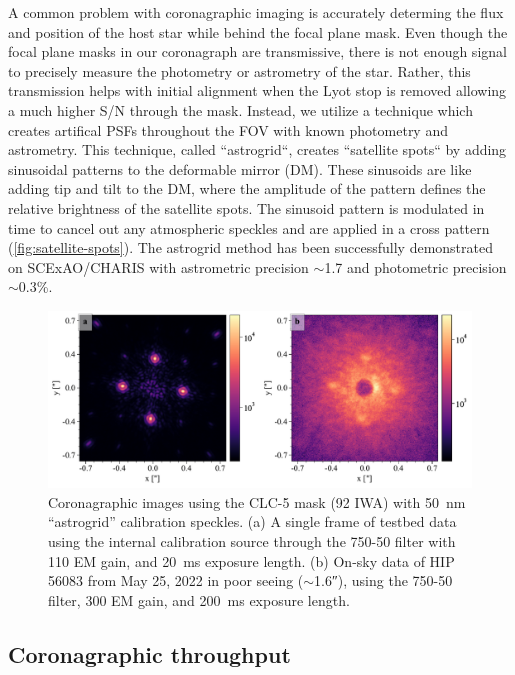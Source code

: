 \documentclass[]{spie}  %
\begin{document}
A common problem with coronagraphic imaging is accurately determing the flux and position of the host star while behind the focal plane mask. Even though the focal plane masks in our coronagraph are transmissive, there is not enough signal to precisely measure the photometry or astrometry of the star. Rather, this transmission helps with initial alignment when the Lyot stop is removed allowing a much higher S/N through the mask. Instead, we utilize a technique which creates artifical PSFs throughout the FOV with known photometry and astrometry. This technique, called ``astrogrid``\cite{sahoo2020}, creates ``satellite spots`` by adding sinusoidal patterns to the deformable mirror (DM). These sinusoids are like adding tip and tilt to the DM, where the amplitude of the pattern defines the relative brightness of the satellite spots. The sinusoid pattern is modulated in time to cancel out any atmospheric speckles and are applied in a cross pattern (\autoref{fig:satellite-spots}). The astrogrid method has been successfully demonstrated on SCExAO/CHARIS with astrometric precision $\sim$\qty{1.7}{\milliarcsecond} and photometric precision $\sim$0.3\%\cite{currie2020}.

\begin{figure}
   \centering
   \includegraphics[width=\textwidth]{figures/astrogrid_psf}
   \caption{Coronagraphic images using the CLC-5 mask (\qty{92}{\milliarcsecond} IWA) with \qty{50}{\nano\meter} ``astrogrid'' calibration speckles. (a) A single frame of testbed data using the internal calibration source through the 750-50 filter with 110 EM gain, and \qty{20}{\milli\second} exposure length. (b) On-sky data of HIP 56083 from May 25, 2022 in poor seeing ($\sim$\ang{;;1.6}), using the 750-50 filter, 300 EM gain, and \qty{200}{\milli\second} exposure length.}\label{fig:satellite-spots}
\end{figure}

\subsection{Coronagraphic throughput}
\end{document}
